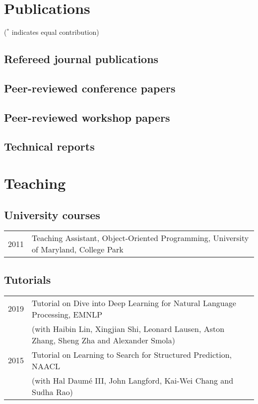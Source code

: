 \documentclass[a4paper,11pt]{article}
\begin{document}
\section{Publications}
($^*$ indicates equal contribution)
\subsection{Refereed journal publications}


\subsection{Peer-reviewed conference papers}


\subsection{Peer-reviewed workshop papers}


\subsection{Technical reports}


\section{Teaching} 
\subsection{University courses}
\begin{tabular}{rl}
2011 & Teaching Assistant, Object-Oriented Programming, University of Maryland, College Park
\end{tabular}

\subsection{Tutorials}
\begin{tabular}{rl}
    2019 & Tutorial on Dive into Deep Learning for Natural Language Processing, EMNLP \\
         & (with Haibin Lin, Xingjian Shi, Leonard Lausen, Aston Zhang, Sheng Zha and Alexander Smola) \\
    2015 & Tutorial on Learning to Search for Structured Prediction, NAACL \\
         & (with Hal Daum\'e III, John Langford, Kai-Wei Chang and Sudha Rao)
\end{tabular}
\end{document}
